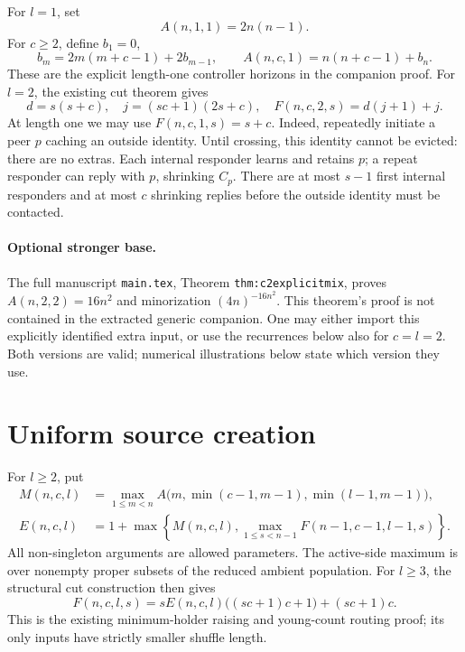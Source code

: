 \documentclass[11pt]{article}
\begin{document}
For $l=1$, set
\[
 A(n,1,1)=2n(n-1).
\]
For $c\ge2$, define $b_1=0$,
\[
 b_m=2m(m+c-1)+2b_{m-1},\qquad
 A(n,c,1)=n(n+c-1)+b_n.
\]
These are the explicit length-one controller horizons in the companion proof.
For $l=2$, the existing cut theorem gives
\[
 d=s(s+c),\quad j=(sc+1)(2s+c),\quad F(n,c,2,s)=d(j+1)+j.
\]
At length one we may use $F(n,c,1,s)=s+c$. Indeed, repeatedly initiate a
peer $p$ caching an outside identity. Until crossing, this identity cannot be
evicted: there are no extras. Each internal responder learns and retains $p$;
a repeat responder can reply with $p$, shrinking $C_p$. There are at most
$s-1$ first internal responders and at most $c$ shrinking replies before the
outside identity must be contacted.

\paragraph{Optional stronger base.}
The full manuscript \texttt{main.tex}, Theorem \texttt{thm:c2explicitmix}, proves
$A(n,2,2)=16n^2$ and minorization $(4n)^{-16n^2}$. This theorem's proof is not
contained in the extracted generic companion. One may either import this
explicitly identified extra input, or use the recurrences below also for
$c=l=2$. Both versions are valid; numerical illustrations below state which
version they use.

\section{Uniform source creation}
For $l\ge2$, put
\begin{align*}
 M(n,c,l)&=\max_{1\le m<n}
 A\bigl(m,\min(c-1,m-1),\min(l-1,m-1)\bigr),\\
 E(n,c,l)&=1+\max\left\{M(n,c,l),
 \max_{1\le s<n-1}F(n-1,c-1,l-1,s)\right\}.
\end{align*}
All non-singleton arguments are allowed parameters. The active-side maximum
is over nonempty proper subsets of the reduced ambient population.
For $l\ge3$, the structural cut construction then gives
\[
 F(n,c,l,s)=sE(n,c,l)\bigl((sc+1)c+1\bigr)+(sc+1)c.
\]
This is the existing minimum-holder raising and young-count routing proof;
its only inputs have strictly smaller shuffle length.
\end{document}
